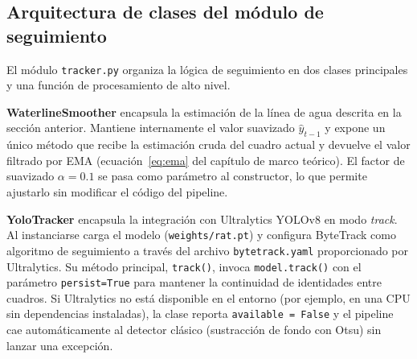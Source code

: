 %


%
%
%


%
%

\subsection{Arquitectura de clases del módulo de seguimiento}

El módulo \texttt{tracker.py} organiza la lógica de seguimiento en dos
clases principales y una función de procesamiento de alto nivel.

\textbf{WaterlineSmoother} encapsula la estimación de la línea de agua
descrita en la sección anterior. Mantiene internamente el valor suavizado
$\hat{y}_{t-1}$ y expone un único método que recibe la estimación cruda del
cuadro actual y devuelve el valor filtrado por EMA
(ecuación~\ref{eq:ema} del capítulo de marco teórico). El factor de
suavizado $\alpha = 0.1$ se pasa como parámetro al constructor, lo que
permite ajustarlo sin modificar el código del pipeline.

\textbf{YoloTracker} encapsula la integración con Ultralytics YOLOv8 en
modo \textit{track}. Al instanciarse carga el modelo
(\texttt{weights/rat.pt}) y configura ByteTrack como algoritmo de
seguimiento a través del archivo \texttt{bytetrack.yaml}
\cite{ultralytics_bytetrack_yaml} proporcionado por Ultralytics. Su método
principal, \texttt{track()}, invoca \texttt{model.track()} con el parámetro
\texttt{persist=True} para mantener la continuidad de identidades entre
cuadros. Si Ultralytics no está disponible en el entorno (por ejemplo, en
una CPU sin dependencias instaladas), la clase reporta
\texttt{available = False} y el pipeline cae automáticamente al detector
clásico (sustracción de fondo con Otsu) sin lanzar una excepción.

